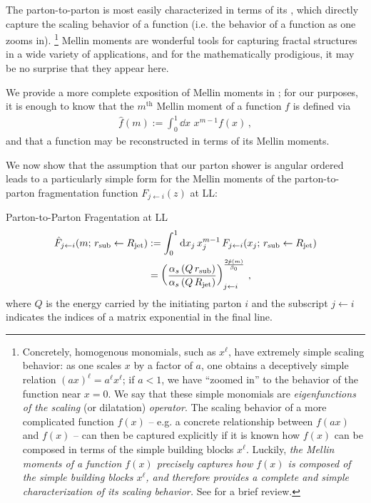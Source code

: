 The \gls{parton-to-parton} is most easily characterized in terms of its , which directly capture the scaling behavior of a function (i.e. the behavior of a function as one zooms in).%
\footnote{
    Concretely, homogenous monomials, such as \(x^\ell\), have extremely simple scaling behavior:
    as one scales \(x\) by a factor of \(a\), one obtains a deceptively simple relation \((a x)^\ell = a^\ell x^\ell\);
    if \(a < 1\), we have ``zoomed in'' to the behavior of the function near \(x = 0\).
    We say that these simple monomials are \textit{eigenfunctions of the scaling} (or dilatation) \textit{operator}.
    The scaling behavior of a more complicated function \(f(x)\) -- e.g. a concrete relationship between \(f(ax)\) and \(f(x)\) -- can then be captured explicitly if it is known how \(f(x)\) can be composed in terms of the simple building blocks \(x^\ell\).
    Luckily, \textit{the Mellin moments of a function \(f(x)\) precisely captures how \(f(x)\) is composed of the simple building blocks \(x^\ell\), and therefore provides a complete and simple characterization of its scaling behavior.}
    See  for a brief review.
}
%
Mellin moments are wonderful tools for capturing fractal structures in a wide variety of applications, and for the mathematically prodigious, it may be no surprise that they appear here.


We provide a more complete exposition of Mellin moments in ;
%
for our purposes, it is enough to know that the \(m^\text{th}\) Mellin moment of a function \(f\) is defined via
\begin{align}
    \hat{f}(m) := \int_0^1 \dd x \,\, x^{m-1} f(x)
    \,,
\end{align}
and that a function may be reconstructed in terms of its Mellin moments.

We now show that the assumption that our parton shower is angular ordered leads to a particularly simple form for the Mellin moments of the parton-to-parton fragmentation function \(F_{j \leftarrow i}(z)\) at LL:

\begin{proposition}{Parton-to-Parton Fragentation at LL}{}
\begin{align}
    \label{eq:mellin_transform_defn}
    \hat{F}_{j \leftarrow i}(m;\,\rsub \leftarrow \Rjet)
    &:=
    \int_0^1 \dd x_j \, x_j^{m-1}
    \,
    F_{j \leftarrow i}(x_j;\,\rsub \leftarrow \Rjet)
    \\
    \label{eq:ll_fragmentation_function}
    &=
    \le(\frac{\alpha_s\le(Q\,\rsub\ri)}{\alpha_s\le(Q\,\Rjet\ri)}\ri)
    ^
    {\frac{2 \hat{p}(m)}{\beta_0}}
    _{j\leftarrow i}
    \,,
\end{align}
where \(Q\) is the energy carried by the initiating parton \(i\) and the subscript \(j \leftarrow i\) indicates the indices of a matrix exponential in the final line.
\end{proposition}



